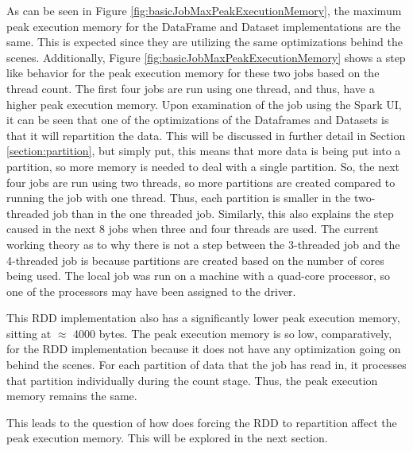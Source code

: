 \documentclass[conference]{IEEEtran}
\begin{document}
As can be seen in Figure \ref{fig:basicJobMaxPeakExecutionMemory}, the maximum peak execution memory for the DataFrame and Dataset implementations are the same.
This is expected since they are utilizing the same optimizations behind the scenes.
Additionally, Figure \ref{fig:basicJobMaxPeakExecutionMemory} shows a step like behavior for the peak execution memory for these two jobs based on the thread count.
The first four jobs are run using one thread, and thus, have a higher peak execution memory.
Upon examination of the job using the Spark UI, it can be seen that one of the optimizations of the Dataframes and Datasets is that it will repartition the data.
This will be discussed in further detail in Section \ref{section:partition}, but simply put, this means that more data is being put into a partition, so more memory is needed to deal with a single partition.
So, the next four jobs are run using two threads, so more partitions are created compared to running the job with one thread.
Thus, each partition is smaller in the two-threaded job than in the one threaded job.
Similarly, this also explains the step caused in the next 8 jobs when three and four threads are used.
The current working theory as to why there is not a step between the 3-threaded job and the 4-threaded job is because partitions are created based on the number of cores being used.
The local job was run on a machine with a quad-core processor, so one of the processors may have been assigned to the driver.

This RDD implementation also has a significantly lower peak execution memory, sitting at $\approx$ 4000 bytes.
The peak execution memory is so low, comparatively, for the RDD implementation because it does not have any optimization going on behind the scenes.
For each partition of data that the job has read in, it processes that partition individually during the count stage.
Thus, the peak execution memory remains the same.

This leads to the question of how does forcing the RDD to repartition affect the peak execution memory.
This will be explored in the next section.
\end{document}
